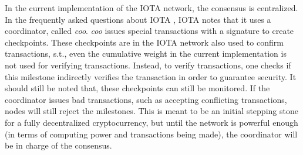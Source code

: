 In the current implementation of the IOTA network, the consensus is centralized. In the frequently asked questions about IOTA \cite{iota-faq}, IOTA notes that it uses a coordinator, called \emph{coo}. \emph{coo} issues special transactions with a signature to create checkpoints. These checkpoints are in the IOTA network also used to confirm transactions, s.t., even the cumulative weight in the current implementation is not used for verifying transactions. Instead, to verify transactions, one checks if this milestone indirectly verifies the transaction in order to guarantee security. It should still be noted that, these checkpoints can still be monitored. If the coordinator issues bad transactions, such as accepting conflicting transactions, nodes will still reject the milestones. This is meant to be an initial stepping stone for a fully decentralized cryptocurrency, but until the network is powerful enough (in terms of computing power and transactions being made), the coordinator will be in charge of the consensus.\\


